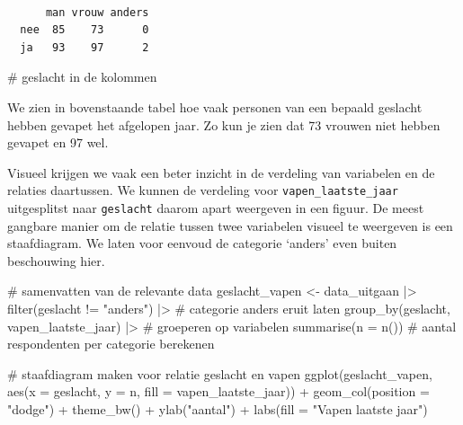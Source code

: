 \documentclass[
  letterpaper,
  DIV=11,
  numbers=noendperiod]{scrreprt}
\newenvironment{Shaded}{\begin{snugshade}}{\end{snugshade}}
\newcommand{\AttributeTok}[1]{\textcolor[rgb]{0.40,0.45,0.13}{#1}}
\newcommand{\CommentTok}[1]{\textcolor[rgb]{0.37,0.37,0.37}{#1}}
\newcommand{\FunctionTok}[1]{\textcolor[rgb]{0.28,0.35,0.67}{#1}}
\newcommand{\NormalTok}[1]{\textcolor[rgb]{0.00,0.23,0.31}{#1}}
\newcommand{\OtherTok}[1]{\textcolor[rgb]{0.00,0.23,0.31}{#1}}
\newcommand{\SpecialCharTok}[1]{\textcolor[rgb]{0.37,0.37,0.37}{#1}}
\newcommand{\StringTok}[1]{\textcolor[rgb]{0.13,0.47,0.30}{#1}}
\begin{document}
\begin{verbatim}
     
      man vrouw anders
  nee  85    73      0
  ja   93    97      2
\end{verbatim}

\begin{Shaded}
\begin{Highlighting}[]
                                              \CommentTok{\# geslacht in de kolommen}
\end{Highlighting}
\end{Shaded}

We zien in bovenstaande tabel hoe vaak personen van een bepaald geslacht
hebben gevapet het afgelopen jaar. Zo kun je zien dat 73 vrouwen niet
hebben gevapet en 97 wel.

Visueel krijgen we vaak een beter inzicht in de verdeling van variabelen
en de relaties daartussen. We kunnen de verdeling voor
\texttt{vapen\_laatste\_jaar} uitgesplitst naar \texttt{geslacht} daarom
apart weergeven in een figuur. De meest gangbare manier om de relatie
tussen twee variabelen visueel te weergeven is een staafdiagram. We
laten voor eenvoud de categorie `anders' even buiten beschouwing hier.

\begin{Shaded}
\begin{Highlighting}[]
\CommentTok{\# samenvatten van de relevante data}
\NormalTok{geslacht\_vapen }\OtherTok{\textless{}{-}}\NormalTok{ data\_uitgaan }\SpecialCharTok{|\textgreater{}}
  \FunctionTok{filter}\NormalTok{(geslacht }\SpecialCharTok{!=} \StringTok{"anders"}\NormalTok{) }\SpecialCharTok{|\textgreater{}} \CommentTok{\# categorie \textquotesingle{}anders\textquotesingle{} eruit laten }
  \FunctionTok{group\_by}\NormalTok{(geslacht, vapen\_laatste\_jaar) }\SpecialCharTok{|\textgreater{}} \CommentTok{\# groeperen op variabelen}
  \FunctionTok{summarise}\NormalTok{(}\AttributeTok{n =} \FunctionTok{n}\NormalTok{()) }\CommentTok{\# aantal respondenten per categorie berekenen}

\CommentTok{\# staafdiagram maken voor relatie geslacht en vapen }
\FunctionTok{ggplot}\NormalTok{(geslacht\_vapen, }\FunctionTok{aes}\NormalTok{(}\AttributeTok{x =}\NormalTok{ geslacht, }\AttributeTok{y =}\NormalTok{ n, }\AttributeTok{fill =}\NormalTok{ vapen\_laatste\_jaar)) }\SpecialCharTok{+}
  \FunctionTok{geom\_col}\NormalTok{(}\AttributeTok{position =} \StringTok{"dodge"}\NormalTok{) }\SpecialCharTok{+}
  \FunctionTok{theme\_bw}\NormalTok{() }\SpecialCharTok{+}
  \FunctionTok{ylab}\NormalTok{(}\StringTok{"aantal"}\NormalTok{) }\SpecialCharTok{+}
  \FunctionTok{labs}\NormalTok{(}\AttributeTok{fill =} \StringTok{"Vapen laatste jaar"}\NormalTok{)}
\end{Highlighting}
\end{Shaded}
\end{document}
